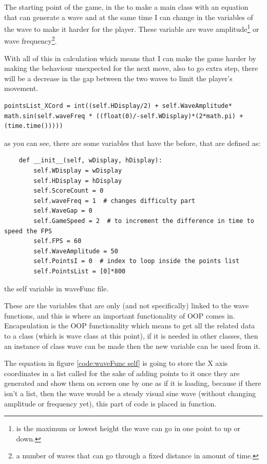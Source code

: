 The starting point of the game, in the  to make a main class  with an equation that can generate a wave and at the same time I can change in the variables of the wave to make it harder for the player. These variable are wave amplitude\footnote{is the maximum or lowest height the wave can go in one point to up or down.} or wave frequency\footnote{a number of waves that can go through a fixed distance in amount of time.}.

With all of this in calculation which means that I can make the game harder by making the behaviour unexpected for the next move, also to go extra step, there will be a decrease in the gap between the two waves to limit the player's movement.

\begin{verbatim}
pointsList_XCord = int((self.HDisplay/2) + self.WaveAmplitude* math.sin(self.waveFreq * ((float(0)/-self.WDisplay)*(2*math.pi) + (time.time()))))
\end{verbatim}
as you can see, there are some variables that have the  before, that are defined as:

\begin{listing}[!ht]
\begin{verbatim}
	def __init__(self, wDisplay, hDisplay):
		self.WDisplay = wDisplay
		self.HDisplay = hDisplay
		self.ScoreCount = 0  
		self.waveFreq = 1  # changes difficulty part
		self.WaveGap = 0
		self.GameSpeed = 2  # to increment the difference in time to speed the FPS
		self.FPS = 60
		self.WaveAmplitude = 50
		self.PointsI = 0  # index to loop inside the points list
		self.PointsList = [0]*800
\end{verbatim}
\caption{the self variable in waveFunc file.}
\label{code:waveFunc self}
\end{listing}


These are the variables that are only (and not specifically) linked to the wave functions, and this is where an important functionality of OOP comes in. Encapsulation is the OOP functionality which means to get all the related data to a class (which is wave class at this point), if it is needed in other classes, then an instance of class wave can be made then the new variable can be used from it.

The equation in figure \ref{code:waveFunc self}  is going to store the X axis coordinates in a list called  for the sake of adding points to it once they are generated and show them on screen one by one as if it is loading, because if there isn't a list, then the wave would be a steady visual sine wave (without changing amplitude or frequency yet), this part of code is placed in  function.

